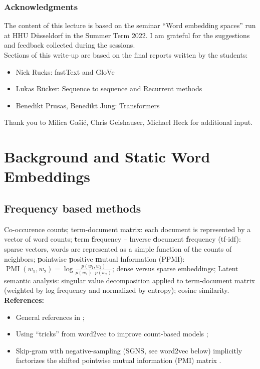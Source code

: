 \documentclass[11pt, a4paper]{amsart}
\begin{document}
\subsubsection{Acknowledgments}

The content of this lecture is based on the seminar ``Word embedding spaces'' run at HHU Düsseldorf in the Summer Term 2022.
I am grateful for the suggestions and feedback collected during the sessions. \\
Sections of this write-up are based on the final reports written by the students:
\begin{itemize}
	\item Nick Rucks: fastText and GloVe
	\item Lukas Rücker: Sequence to sequence and Recurrent methods
	\item Benedikt Prusas, Benedikt Jung: Transformers
\end{itemize}

Thank you to Milica Gašić, Chris Geishauser, Michael Heck for additional input. \\


\section{Background and Static Word Embeddings}
\label{sec:static_word_embeddings}


\subsection{Frequency based methods}

Co-occurence counts;
term-document matrix: each document is represented by a vector of word counts;
\textbf{t}erm \textbf{f}requency -- \textbf{i}nverse \textbf{d}ocument \textbf{f}requency (tf-idf):
sparse vectors, words are represented as a simple function of the counts of neighbors;
\textbf{p}ointwise \textbf{p}ositive \textbf{m}utual \textbf{i}nformation (PPMI):
$\operatorname{PMI}(w_{1}, w_{2}) = \log \frac{p(w_{1}, w_{2})}{p(w_{1}) \cdot p(w_{2})}$;
dense versus sparse embeddings;
Latent semantic analysis:
singular value decomposition applied to term-document matrix (weighted by log frequency and normalized by entropy);
cosine similarity.
\newline
\textbf{References:}
\begin{itemize}
    \item General references in ;
    \item Using ``tricks'' from word2vec to improve count-based models \cite{levy-etal-2015-improving};
    \item Skip-gram with negative-sampling (SGNS, see word2vec below) implicitly factorizes the shifted pointwise mutual information (PMI) matrix \cite{NIPS2014_feab05aa}.
\end{itemize}
\end{document}
